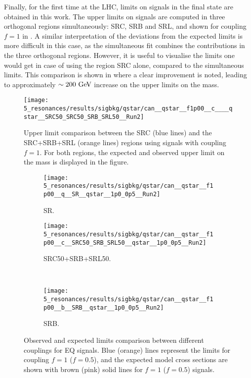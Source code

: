 Finally, for the first time at the \ac{LHC}, limits on \cstar signals in the \gammajet final state are obtained in this work. The upper limits on \cstar signals are computed in three orthogonal regions simultaneously: SRC, SRB and SRL, and shown for coupling \(f=1\) in \Fig{\ref{fig:results:results:bkgsig:results:qstar:limits:SRC}}. A similar interpretation of the deviations from the expected limits is more difficult in this case, as the simultaneous fit combines the contributions in the three orthogonal regions. However, it is useful to visualise the limits one would get in case of using the \ctagging region SRC alone, compared to the simultaneous limits. This comparison is shown in \Fig{\ref{fig:results:results:bkgsig:results:qstar:limits_SRC_comparison}} where a clear improvement is noted, leading to approximately \(\sim 200~\text{GeV}\) increase on the upper limits on the \mc mass.

\begin{figure}[ht!]
    \centering
    \texttt{[image: 5\_resonances/results/sigbkg/qstar/can\_\_qstar\_\_f1p00\_\_c\_\_\_\_qstar\_\_SRC50\_SRC50\_SRB\_SRL50\_\_Run2]}
    \caption{Upper limit comparison between the SRC (blue lines) and the SRC+SRB+SRL (orange lines) regions using \cstar signals with coupling \(f=1\). For both regions, the expected and observed upper limit on the \mq mass is displayed in the figure.}
    \label{fig:results:results:bkgsig:results:qstar:limits_SRC_comparison}
\end{figure}

\begin{figure}[ht!]
    \centering
    \begin{subfigure}[t]{0.49\linewidth}
        \centering
        \texttt{[image: 5\_resonances/results/sigbkg/qstar/can\_\_qstar\_\_f1p00\_\_q\_\_SR\_\_qstar\_\_1p0\_0p5\_\_Run2]}
        \caption{SR.}
        \label{fig:results:results:bkgsig:results:qstar:limits_couplings_comparison:SR}
    \end{subfigure}
    \hfill
    \begin{subfigure}[t]{0.49\linewidth}
        \centering
        \texttt{[image: 5\_resonances/results/sigbkg/qstar/can\_\_qstar\_\_f1p00\_\_c\_\_SRC50\_SRB\_SRL50\_\_qstar\_\_1p0\_0p5\_\_Run2]}
        \caption{SRC50+SRB+SRL50.}
        \label{fig:results:results:bkgsig:results:qstar:limits_couplings_comparison:SRC}
    \end{subfigure}\\
    \begin{subfigure}[t]{0.49\linewidth}
        \centering
        \texttt{[image: 5\_resonances/results/sigbkg/qstar/can\_\_qstar\_\_f1p00\_\_b\_\_SRB\_\_qstar\_\_1p0\_0p5\_\_Run2]}
        \caption{SRB.}
        \label{fig:results:results:bkgsig:results:qstar:limits_couplings_comparison:SRB}
    \end{subfigure}
    \caption{Observed and expected limits comparison between different couplings for \ac{EQ} signals. Blue (orange) lines represent the limits for coupling \(f=1\) (\(f=0.5\)), and the expected model cross sections are shown with brown (pink) solid lines for \(f=1\) (\(f=0.5\)) signals.}
    \label{fig:results:results:bkgsig:results:qstar:limits_couplings_comparison}
\end{figure}

